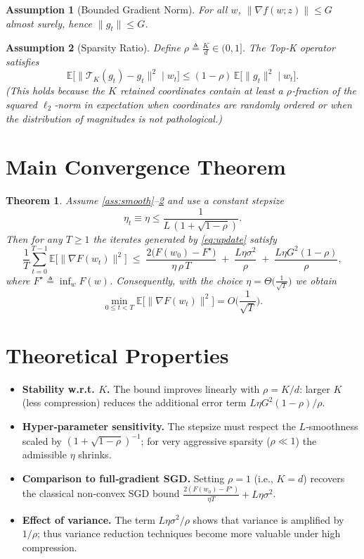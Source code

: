\documentclass{article}
\newcommand{\E}{\mathbb{E}}
\newtheorem{assumption}{Assumption}
\newtheorem{theorem}{Theorem}
\begin{document}
\begin{assumption}[Bounded Gradient Norm]
\label{ass:bound}
For all $w$, $\|\nabla f(w;z)\|\le G$ almost surely, hence $\|g_t\|\le G$.
\end{assumption}

\begin{assumption}[Sparsity Ratio]
\label{ass:sparsity}
Define $\rho\triangleq\frac{K}{d}\in(0,1]$. The Top‑K operator satisfies
\[
\E\big[\|\mathcal{T}_K(g_t)-g_t\|^2\mid w_t\big]\le (1-\rho)\,\E\big[\|g_t\|^2\mid w_t\big].
\]
(This holds because the $K$ retained coordinates contain at least a $\rho$‑fraction of the squared $\ell_2$‑norm in expectation when coordinates are randomly ordered or when the distribution of magnitudes is not pathological.) 
\end{assumption}

\section*{Main Convergence Theorem}
\begin{theorem}
\label{thm:main}
Assume \ref{ass:smooth}–\ref{ass:sparsity} and use a constant stepsize
\[
\eta_t\equiv\eta\le\frac{1}{L\,(1+\sqrt{1-\rho})}.
\]
Then for any $T\ge1$ the iterates generated by \eqref{eq:update} satisfy
\[
\frac{1}{T}\sum_{t=0}^{T-1}\E\big[\|\nabla F(w_t)\|^2\big]
\;\le\;
\frac{2\big(F(w_0)-F^\star\big)}{\eta\,\rho\,T}
\;+\;
\frac{L\eta\sigma^2}{\rho}
\;+\;
\frac{L\eta G^2(1-\rho)}{\rho},
\]
where $F^\star\triangleq\inf_wF(w)$.  
Consequently, with the choice $\eta = \Theta\big(\frac{1}{\sqrt{T}}\big)$ we obtain
\[
\min_{0\le t<T}\E\big[\|\nabla F(w_t)\|^2\big]=O\!\Big(\frac{1}{\sqrt{T}}\Big).
\]
\end{theorem}

\section*{Theoretical Properties}
\begin{itemize}
    \item \textbf{Stability w.r.t. $K$.} The bound improves linearly with $\rho=K/d$: larger $K$ (less compression) reduces the additional error term $L\eta G^2(1-\rho)/\rho$.
    \item \textbf{Hyper‑parameter sensitivity.} The stepsize must respect the $L$‑smoothness scaled by $(1+\sqrt{1-\rho})^{-1}$; for very aggressive sparsity ($\rho\ll1$) the admissible $\eta$ shrinks.
    \item \textbf{Comparison to full‑gradient SGD.} Setting $\rho=1$ (i.e., $K=d$) recovers the classical non‑convex SGD bound 
    $\frac{2(F(w_0)-F^\star)}{\eta T}+L\eta\sigma^2$.
    \item \textbf{Effect of variance.} The term $L\eta\sigma^2/\rho$ shows that variance is amplified by $1/\rho$; thus variance reduction techniques become more valuable under high compression.
\end{itemize}
\end{document}

